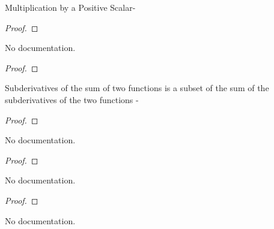\begin{theorem}\label{HasSubgradientAt.pos_smul}
        \leanok
                Multiplication by a Positive Scalar-
    \end{theorem}

\begin{proof}
    \leanok
\end{proof}

\begin{theorem}\label{SubderivAt.pos_smul}
        \leanok
                No documentation.
    \end{theorem}

\begin{proof}
    \leanok
\end{proof}

\begin{theorem}\label{SubderivAt.add_subset}
        \leanok
                Subderivatives of the sum of two functions is a subset of the sum of the
subderivatives of the two functions -
    \end{theorem}

\begin{proof}
    \leanok
\end{proof}

\begin{theorem}\label{SubderivAt.add}
        \leanok
                No documentation.
    \end{theorem}

\begin{proof}
    \leanok
\end{proof}

\begin{theorem}\label{SubderivAt_of_norm_at_zero}
        \leanok
                No documentation.
    \end{theorem}

\begin{proof}
    \leanok
\end{proof}

\begin{theorem}\label{SubderivAt_abs}
        \leanok
                No documentation.
    \end{theorem}

